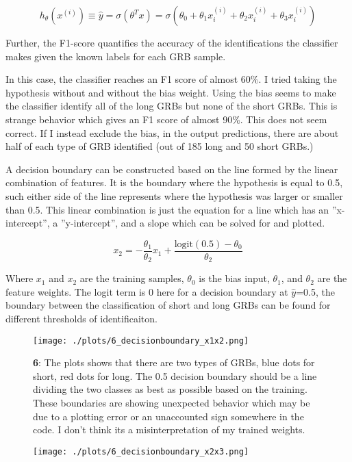 \begin{equation}
  h_{\theta}(x^{(i)}) \equiv \hat{y} = \sigma(\theta^Tx) = \sigma(\theta_0+\theta_1x_i^{(i)}+\theta_2x_i^{(i)}+\theta_3x_i^{(i)})
\end{equation}

Further, the F1-score quantifies the accuracy of the identifications the classifier makes given the known labels for each GRB sample.

In this case, the classifier reaches an F1 score of almost 60\%. I tried taking the hypothesis without and without the bias weight. Using the bias seems to make the classifier identify all of the long GRBs but none of the short GRBs. This is strange behavior which gives an F1 score of almost 90\%. This does not seem correct. If I instead exclude the bias, in the output predictions, there are about half of each type of GRB identified (out of 185 long and 50 short GRBs.)

A decision boundary can be constructed based on the line formed by the linear combination of features. It is the boundary where the hypothesis is equal to 0.5, such either side of the line represents where the hypothesis was larger or smaller than 0.5. This linear combination is just the equation for a line which has an ''x-intercept'', a ''y-intercept'', and a slope which can be solved for and plotted.

\begin{equation}
  x_2 = -\frac{\theta_1}{\theta_2}x_1 + \frac{\text{logit}(0.5)-\theta_0}{\theta_2}
\end{equation}

Where $x_1$ and $x_2$ are the training samples, $\theta_0$ is the bias input, $\theta_1$, and $\theta_2$ are the feature weights. The logit term is 0 here for a decision boundary at $\hat{y}$=0.5, the boundary between the classification of short and long GRBs can be found for different thresholds of identificaiton.

\begin{figure}[h!]
  \centering
  \texttt{[image: ./plots/6\_decisionboundary\_x1x2.png]}
  \caption{\textbf{6}: The plots shows that there are two types of GRBs, blue dots for short, red dots for long. The 0.5 decision boundary should be a line dividing the two classes as best as possible based on the training. These boundaries are showing unexpected behavior which may be due to a plotting error or an unaccounted sign somewhere in the code. I don't think its a misinterpretation of my trained weights.}
  \label{fig:decisionboundary1}
\end{figure}

\begin{figure}[h!]
  \centering
  \texttt{[image: ./plots/6\_decisionboundary\_x2x3.png]}
  \label{fig:decisionboundary2}
\end{figure}